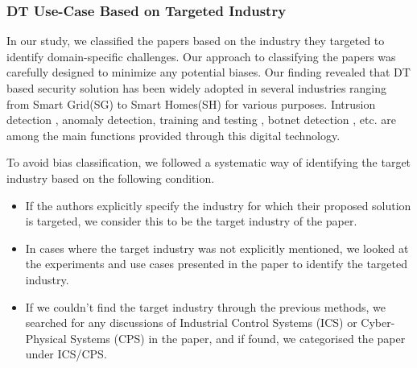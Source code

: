 




\subsubsection{DT Use-Case Based on Targeted Industry}

In our study, we classified the papers based on the industry they targeted to identify domain-specific challenges. Our approach to classifying the papers was carefully designed to minimize any potential biases. Our finding revealed that DT based security solution has been widely adopted in several industries ranging from Smart Grid(SG) to Smart Homes(SH) for various purposes. Intrusion detection \cite{akbarianIntrusionDetectionDigital2020}, anomaly detection, training and testing \cite{rebecchiDigitalTwin5G2022,becueCyberFactorySecuringIndustry40with2018}, botnet detection \cite{salimBlockchainEnabledSecureDigital2022}, etc. are among the main functions provided through this digital technology. 


To avoid bias classification, we followed a systematic way of identifying the target industry based on the following condition. 

\begin{itemize}
    \item If the authors explicitly specify the industry for which their proposed solution is targeted, we consider this to be the target industry of the paper.
    \item In cases where the target industry was not explicitly mentioned, we looked at the experiments and use cases presented in the paper to identify the targeted industry.
    \item If we couldn't find the target industry through the previous methods, we searched for any discussions of Industrial Control Systems (ICS) or Cyber-Physical Systems (CPS) in the paper, and if found, we categorised the paper under ICS/CPS.
\end{itemize}


